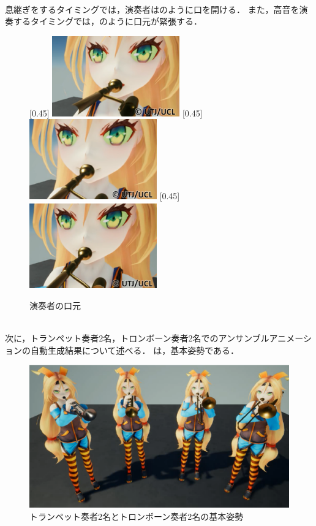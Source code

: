 \\
息継ぎをするタイミングでは，演奏者はのように口を開ける．
また，高音を演奏するタイミングでは，のように口元が緊張する．
\vspace{-2mm}
\begin{figure}[h]
	\centering
	[0.45\linewidth]{
		\includegraphics[width=5.5cm]{fig/chap4/anim1_zoom_breath.eps}}
	[0.45\linewidth]{
		\includegraphics[width=5.5cm]{fig/chap4/anim1_zoom_high.eps}}
	[0.45\linewidth]{
		\includegraphics[width=5.5cm]{fig/chap4/anim1_zoom.eps}}
	\caption{演奏者の口元}
	\label{fig:zoom}
\end{figure}
\\
\indent
次に，トランペット奏者2名，トロンボーン奏者2名でのアンサンブルアニメーションの自動生成結果について述べる．
は，基本姿勢である．
\begin{figure}[h]
	\centering
	\includegraphics[width=13cm]{fig/chap4/anim2.eps}
	\caption{トランペット奏者2名とトロンボーン奏者2名の基本姿勢}
	\label{fig:anim2}
\end{figure}
